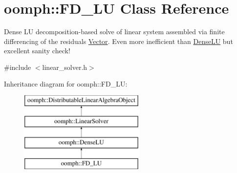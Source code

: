 \hypertarget{classoomph_1_1FD__LU}{}\section{oomph\+:\+:F\+D\+\_\+\+LU Class Reference}
\label{classoomph_1_1FD__LU}


Dense LU decomposition-\/based solve of linear system assembled via finite differencing of the residuals \hyperlink{classoomph_1_1Vector}{Vector}. Even more inefficient than \hyperlink{classoomph_1_1DenseLU}{Dense\+LU} but excellent sanity check!  




{\ttfamily \#include $<$linear\+\_\+solver.\+h$>$}

Inheritance diagram for oomph\+:\+:F\+D\+\_\+\+LU\+:\begin{figure}[H]
\begin{center}
\leavevmode
\includegraphics[height=4.000000cm]{classoomph_1_1FD__LU}
\end{center}
\end{figure}
